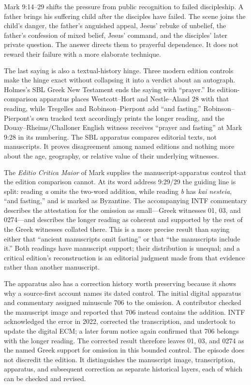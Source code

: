 Mark 9:14--29 shifts the pressure from public recognition to failed
discipleship. A father brings his suffering child after the disciples have
failed. The scene joins the child's danger, the father's anguished appeal,
Jesus' rebuke of unbelief, the father's confession of mixed belief, Jesus'
command, and the disciples' later private question. The answer directs them
to prayerful dependence. It does not reward their failure with a more
elaborate technique.

The last saying is also a textual-history hinge. Three modern edition controls
make the hinge exact without collapsing it into a verdict about an autograph.
Holmes's SBL Greek New Testament ends the saying with ``prayer.'' Its
edition-comparison apparatus places Westcott--Hort and Nestle--Aland 28 with
that reading, while Tregelles and Robinson--Pierpont add ``and fasting.''
Robinson--Pierpont's own tracked text accordingly prints the longer reading,
and the Douay--Rheims/Challoner English witness receives ``prayer and
fasting'' at Mark 9:28 in its numbering. The SBL apparatus compares editorial
texts, not manuscripts. It proves disagreement among named editions and
nothing more about the age, geography, or relative value of their underlying
witnesses.

The \emph{Editio Critica Maior} of Mark supplies the manuscript-apparatus
control that the edition comparison cannot. At its word address 9:29/29 the
guiding line is split: reading \emph{a} omits the two-word addition, while
reading \emph{b} has \emph{kai nesteia}, ``and fasting,'' and is marked as
Byzantine. The accompanying INTF commentary describes the attestation for the
omission as small---Greek witnesses 01, 03, and 0274---and describes the
longer reading as coherent and supported by the rest of the Greek witnesses
collated there. This is a more precise result than saying either that
``ancient manuscripts omit fasting'' or that ``the manuscripts include it.''
Both readings have manuscript support; their distribution is unequal; and a
critical edition's reconstruction is an editorial judgment made from that
evidence rather than another manuscript.

The apparatus also has a correction history worth preserving because it shows
why a source-first account names its dated control. The initial digital
apparatus and commentary assigned minuscule 706 to the omission. A contributor
checked the manuscript image and reported that 706 instead contains the
addition. INTF acknowledged the error in 2022, corrected the transcription,
and undertook to update the digital ECM; a later forum notice again confirmed
that 706 belongs with the longer reading. The corrected result therefore
leaves 01, 03, and 0274 as the named Greek support for omission in this
bounded control. The episode does not discredit the edition. It distinguishes
the manuscript image, transcription, apparatus, and subsequent correction as
separate historical layers, each of which can be checked and revised.


